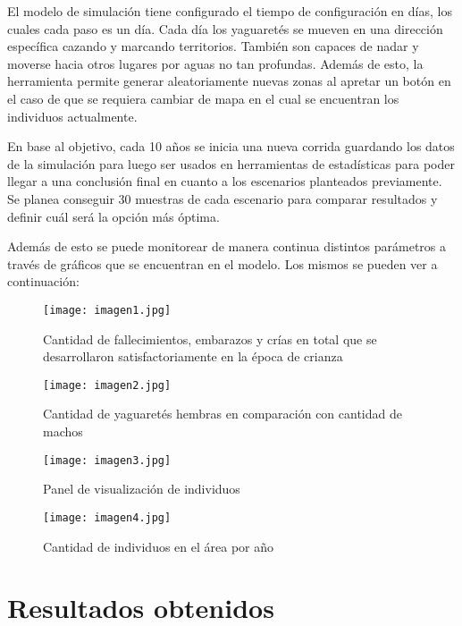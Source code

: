     El modelo de simulación tiene configurado el tiempo de configuración en días, los cuales cada paso es un día. Cada día los yaguaretés se mueven en una dirección específica cazando y marcando territorios. También son capaces de nadar y moverse hacia otros lugares por aguas no tan profundas. Además de esto, la herramienta permite generar aleatoriamente nuevas zonas al apretar un botón en el caso de que se requiera cambiar de mapa en el cual se encuentran los individuos actualmente.

    En base al objetivo, cada 10 años se inicia una nueva corrida guardando los datos de la simulación para luego ser usados en herramientas de estadísticas para poder llegar a una conclusión final en cuanto a los escenarios planteados previamente. Se planea conseguir 30 muestras de cada escenario para comparar resultados y definir cuál será la opción más óptima.
    
    Además de esto se puede monitorear de manera continua distintos parámetros a través de gráficos que se encuentran en el modelo. 
    Los mismos se pueden ver a continuación:

    \begin{figure}
        \centering
        \texttt{[image: imagen1.jpg]}
        \caption{Cantidad de fallecimientos, embarazos y crías en total que se desarrollaron satisfactoriamente en la época de crianza}
        \label{fig:fig1}
    \end{figure}

    \begin{figure}
        \centering
        \texttt{[image: imagen2.jpg]}
        \caption{Cantidad de yaguaretés hembras en comparación con cantidad de machos}
        \label{fig:fig2}
    \end{figure}

    \begin{figure}
        \centering
        \texttt{[image: imagen3.jpg]}
        \caption{Panel de visualización de individuos}
        \label{fig:fig3}
    \end{figure}

    \begin{figure}
        \centering
        \texttt{[image: imagen4.jpg]}
        \caption{Cantidad de individuos en el área por año}
        \label{fig:fig4}
    \end{figure}

\section{Resultados obtenidos}
